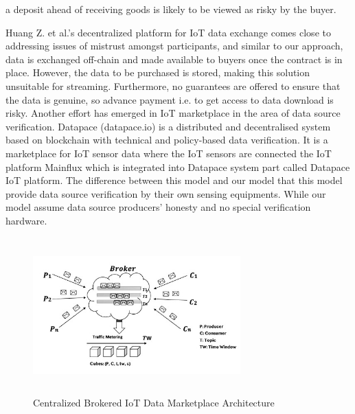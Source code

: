 \documentclass[12pt]{article}
\begin{document}
a deposit ahead of receiving goods is likely to be viewed as
risky by the buyer.\par
Huang Z. et al.’s decentralized platform for IoT data
exchange comes close to addressing issues of mistrust
amongst participants, and similar to our approach, data is
exchanged off-chain and made available to buyers once the
contract is in place. However, the data to be purchased
is stored, making this solution unsuitable for streaming.
Furthermore, no guarantees are offered to ensure that the
data is genuine, so advance payment i.e. to get access to
data download is risky.
Another effort has emerged in IoT marketplace in the area
of data source verification. Datapace (datapace.io) is a
distributed and decentralised system based on blockchain
with technical and policy-based data verification. It is a
marketplace for IoT sensor data where the IoT sensors are
connected the IoT platform Mainflux which is integrated
into Datapace system part called Datapace IoT platform.
The difference between this model and our model that this
model provide data source verification by their own sensing
equipments. While our model assume data source producers’
honesty and no special verification hardware.





\begin{figure}[h!]
\begin{center}
\includegraphics[width=8cm, height=6cm]{L3}
\caption{ Centralized Brokered IoT Data Marketplace Architecture}
\end{center}
\end{figure}
\end{document}
